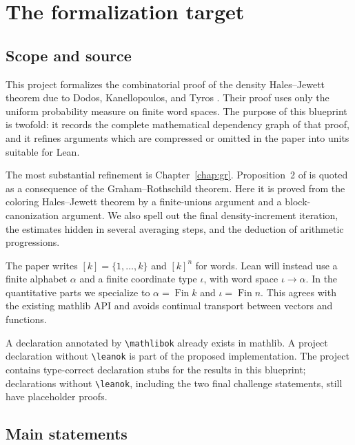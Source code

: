\chapter{The formalization target}

\section{Scope and source}

This project formalizes the combinatorial proof of the density Hales--Jewett theorem due to
Dodos, Kanellopoulos, and Tyros \cite{DKT}.  Their proof uses only the uniform probability
measure on finite word spaces.  The purpose of this blueprint is twofold: it records the complete
mathematical dependency graph of that proof, and it refines arguments which are compressed or
omitted in the paper into units suitable for Lean.

The most substantial refinement is Chapter~\ref{chap:gr}.  Proposition~2 of \cite{DKT} is quoted
as a consequence of the Graham--Rothschild theorem.  Here it is proved from the coloring
Hales--Jewett theorem by a finite-unions argument and a block-canonization argument.  We also spell
out the final density-increment iteration, the estimates hidden in several averaging steps, and the
deduction of arithmetic progressions.

The paper writes $[k]=\{1,\ldots,k\}$ and $[k]^n$ for words.  Lean will instead use a finite
alphabet $\alpha$ and a finite coordinate type $\iota$, with word space $\iota\to\alpha$.  In the
quantitative parts we specialize to $\alpha=\operatorname{Fin} k$ and
$\iota=\operatorname{Fin} n$.  This agrees with the existing mathlib API and avoids continual
transport between vectors and functions.

\begin{remark}
A declaration annotated by \texttt{\textbackslash mathlibok} already exists in mathlib.  A project
declaration without \texttt{\textbackslash leanok} is part of the proposed implementation.  The
project contains type-correct declaration stubs for the results in this blueprint; declarations
without \texttt{\textbackslash leanok}, including the two final challenge statements, still have
placeholder proofs.
\end{remark}

\section{Main statements}

